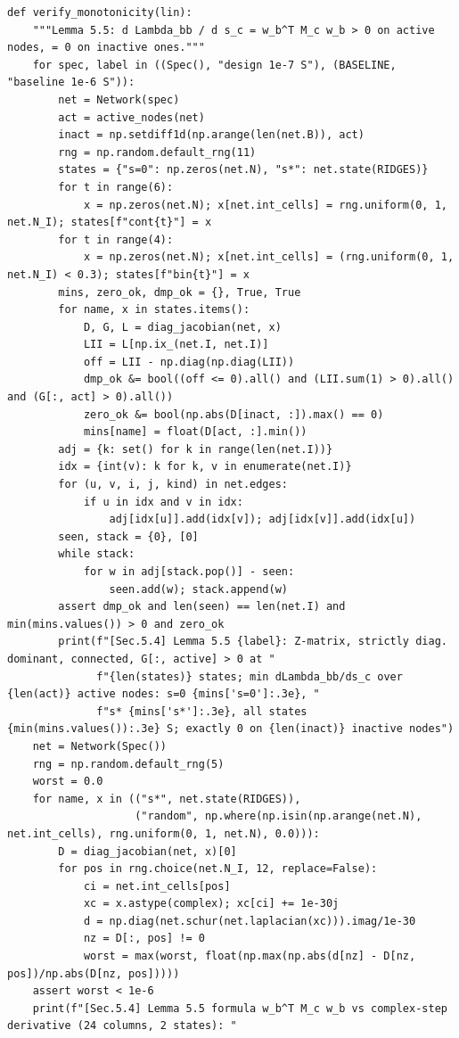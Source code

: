 \documentclass[11pt,a4paper]{article}
\theoremstyle{definition}
\theoremstyle{remark}
\begin{document}
\begin{lstlisting}
def verify_monotonicity(lin):
    """Lemma 5.5: d Lambda_bb / d s_c = w_b^T M_c w_b > 0 on active nodes, = 0 on inactive ones."""
    for spec, label in ((Spec(), "design 1e-7 S"), (BASELINE, "baseline 1e-6 S")):
        net = Network(spec)
        act = active_nodes(net)
        inact = np.setdiff1d(np.arange(len(net.B)), act)
        rng = np.random.default_rng(11)
        states = {"s=0": np.zeros(net.N), "s*": net.state(RIDGES)}
        for t in range(6):
            x = np.zeros(net.N); x[net.int_cells] = rng.uniform(0, 1, net.N_I); states[f"cont{t}"] = x
        for t in range(4):
            x = np.zeros(net.N); x[net.int_cells] = (rng.uniform(0, 1, net.N_I) < 0.3); states[f"bin{t}"] = x
        mins, zero_ok, dmp_ok = {}, True, True
        for name, x in states.items():
            D, G, L = diag_jacobian(net, x)
            LII = L[np.ix_(net.I, net.I)]
            off = LII - np.diag(np.diag(LII))
            dmp_ok &= bool((off <= 0).all() and (LII.sum(1) > 0).all() and (G[:, act] > 0).all())
            zero_ok &= bool(np.abs(D[inact, :]).max() == 0)
            mins[name] = float(D[act, :].min())
        adj = {k: set() for k in range(len(net.I))}
        idx = {int(v): k for k, v in enumerate(net.I)}
        for (u, v, i, j, kind) in net.edges:
            if u in idx and v in idx:
                adj[idx[u]].add(idx[v]); adj[idx[v]].add(idx[u])
        seen, stack = {0}, [0]
        while stack:
            for w in adj[stack.pop()] - seen:
                seen.add(w); stack.append(w)
        assert dmp_ok and len(seen) == len(net.I) and min(mins.values()) > 0 and zero_ok
        print(f"[Sec.5.4] Lemma 5.5 {label}: Z-matrix, strictly diag. dominant, connected, G[:, active] > 0 at "
              f"{len(states)} states; min dLambda_bb/ds_c over {len(act)} active nodes: s=0 {mins['s=0']:.3e}, "
              f"s* {mins['s*']:.3e}, all states {min(mins.values()):.3e} S; exactly 0 on {len(inact)} inactive nodes")
    net = Network(Spec())
    rng = np.random.default_rng(5)
    worst = 0.0
    for name, x in (("s*", net.state(RIDGES)),
                    ("random", np.where(np.isin(np.arange(net.N), net.int_cells), rng.uniform(0, 1, net.N), 0.0))):
        D = diag_jacobian(net, x)[0]
        for pos in rng.choice(net.N_I, 12, replace=False):
            ci = net.int_cells[pos]
            xc = x.astype(complex); xc[ci] += 1e-30j
            d = np.diag(net.schur(net.laplacian(xc))).imag/1e-30
            nz = D[:, pos] != 0
            worst = max(worst, float(np.max(np.abs(d[nz] - D[nz, pos])/np.abs(D[nz, pos]))))
    assert worst < 1e-6
    print(f"[Sec.5.4] Lemma 5.5 formula w_b^T M_c w_b vs complex-step derivative (24 columns, 2 states): "

\end{lstlisting}
\end{document}

